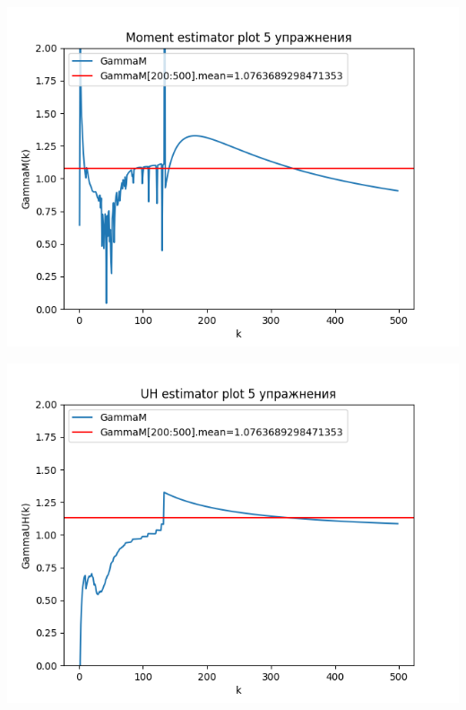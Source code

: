 \documentclass[reprint, amsmath, amssymb, aps,]{revtex4-2}
\begin{document}
\begin{center}
\centering 
\includegraphics[scale=0.6]{Exercise53.png}
\end{center}

\begin{center}
\centering 
\includegraphics[scale=0.6]{Exercise54.png}
\end{center}
\end{document}
